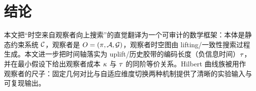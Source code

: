 \section{结论}

本文把“时空来自观察者向上搜索”的直觉翻译为一个可审计的数学框架：本体是静态约束系统 \(\mathcal{C}\)，观察者是 \(O=(\pi,\mathcal A,\mathcal G)\)，观察者时空图由 lifting/一致性搜索过程生成。本文进一步把时间轴落实为 uplift/历史胶带的编码长度（负信息时间）\(\tau\)，并在最小假设下给出观察者成本 \(\kappa\) 与 \(\tau\) 的同阶等价关系。Hilbert 曲线族被用作观察者的尺子：固定几何对比与自适应维度切换两种机制提供了清晰的实验输入与可复现输出。

